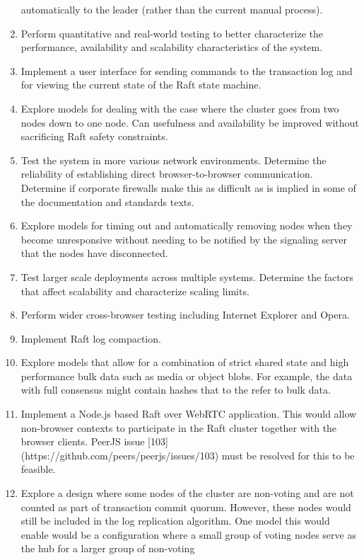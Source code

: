 \documentclass{acmtog} %
\begin{document}
\begin{enumerate}
  automatically to the leader (rather than the current manual
  process).
\item Perform quantitative and real-world testing to better characterize
  the performance, availability and scalability characteristics of the
  system.
\item Implement a user interface for sending commands to the transaction
  log and for viewing the current state of the Raft state machine.
\item Explore models for dealing with the case where the cluster goes from
  two nodes down to one node. Can usefulness and availability be
  improved without sacrificing Raft safety constraints.
\item Test the system in more various network environments. Determine the
  reliability of establishing direct browser-to-browser communication.
  Determine if corporate firewalls make this as difficult as is
  implied in some of the documentation and standards texts.
\item Explore models for timing out and automatically removing nodes
  when they become unresponsive without needing to be notified by the
  signaling server that the nodes have disconnected.
\item Test larger scale deployments across multiple systems. Determine the
  factors that affect scalability and characterize scaling limits.
\item Perform wider cross-browser testing including Internet Explorer and
  Opera.
\item Implement Raft log compaction.
\item Explore models that allow for a combination of strict shared state
  and high performance bulk data such as media or object blobs. For
  example, the data with full consensus might contain hashes that to
  the refer to bulk data.
\item Implement a Node.js based Raft over WebRTC application. This would
  allow non-browser contexts to participate in the Raft cluster
  together with the browser clients. PeerJS issue
  [103](https://github.com/peers/peerjs/issues/103) must be resolved
  for this to be feasible.
\item Explore a design where some nodes of the cluster are non-voting and
  are not counted as part of transaction commit quorum. However, these
  nodes would still be included in the log replication algorithm. One
  model this would enable would be a configuration where a small group
  of voting nodes serve as the hub for a larger group of non-voting

\end{enumerate}
\end{document}
